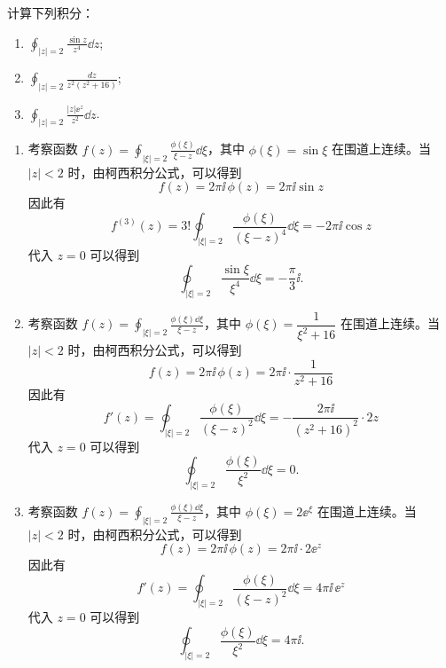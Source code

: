 \begin{question}
计算下列积分：

\begin{enumerate}
  \item \(\displaystyle \oint_{|z|=2} \frac{\sin z}{z^4}\dd{z}\);\qquad
  \item \(\displaystyle \oint_{|z|=2} \frac{dz}{z^2(z^2+16)}\);\qquad
  \item \(\displaystyle \oint_{|z|=2} \frac{|z|\ee^{z}}{z^2}\dd{z}\).

\end{enumerate}
\begin{solution}

\begin{enumerate}
  \item 考察函数 \(f(z)=\displaystyle\oint_{|\xi|=2} \frac{\phi(\xi)}{\xi-z}\dd{}\xi\)，其中 \(\phi(\xi)=\sin\xi\) 在围道上连续。当 \(|z|<2\) 时，由柯西积分公式，可以得到
\[ f(z)=2\pi\ii\,\phi(z)=2\pi\ii\sin z \]
因此有
\[ f^{(3)}(z)=3! \oint_{|\xi|=2} \frac{\phi(\xi)}{(\xi-z)^4}\dd{}\xi = -2\pi\ii\cos z \]
代入 \(z=0\) 可以得到
\[ \oint_{|\xi|=2} \frac{\sin\xi}{\xi^4}\dd{}\xi = -\frac{\pi}{3}\ii. \]

  \item 考察函数 \(f(z)=\displaystyle\oint_{|\xi|=2} \frac{\phi(\xi)\dd{}\xi}{\xi-z}\)，其中 \(\phi(\xi)=\dfrac1{\xi^2+16}\) 在围道上连续。当 \(|z|<2\) 时，由柯西积分公式，可以得到
\[ f(z)=2\pi\ii\,\phi(z)=2\pi\ii\cdot\frac1{z^2+16} \]
因此有
\[ f'(z)=\oint_{|\xi|=2} \frac{\phi(\xi)}{(\xi-z)^2}\dd{}\xi = -\frac{2\pi\ii}{(z^2+16)^2}\cdot 2z \]
代入 \(z=0\) 可以得到
\[ \oint_{|\xi|=2} \frac{\phi(\xi)}{\xi^2}\dd{}\xi = 0. \]

  \item 考察函数 \(f(z)=\displaystyle\oint_{|\xi|=2} \frac{\phi(\xi)\dd{}\xi}{\xi-z}\)，其中 \(\phi(\xi)=2\ee^{\xi}\) 在围道上连续。当 \(|z|<2\) 时，由柯西积分公式，可以得到
\[ f(z)=2\pi\ii\,\phi(z)=2\pi\ii\cdot2\ee^{z} \]
因此有
\[ f'(z)=\oint_{|\xi|=2} \frac{\phi(\xi)}{(\xi-z)^2}\dd{}\xi = 4\pi\ii\,\ee^{z} \]
代入 \(z=0\) 可以得到
\[ \oint_{|\xi|=2} \frac{\phi(\xi)}{\xi^2}\dd{}\xi = 4\pi\ii. \]
\end{enumerate}
\end{solution}
\end{question}

